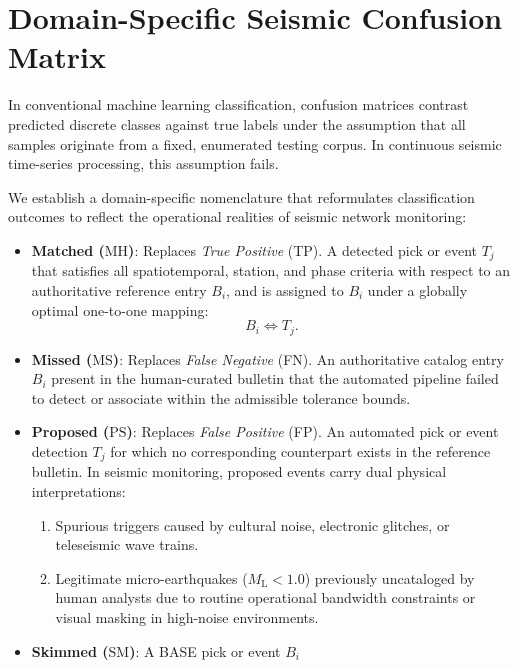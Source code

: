 \section{Domain-Specific Seismic Confusion Matrix}
\label{sec:confusion_matrix}

In conventional machine learning classification, confusion matrices
contrast predicted discrete classes against true labels under the
assumption that all samples originate from a fixed, enumerated
testing corpus. In continuous seismic time-series processing, this
assumption fails.

We establish a domain-specific nomenclature that reformulates
classification outcomes to reflect the operational realities of
seismic network monitoring:

\begin{itemize}
  \item \textbf{Matched ($\mathrm{MH}$)}: Replaces \textit{True
    Positive} (\ac{TP}). A detected pick or event $T_j$ that
    satisfies all spatiotemporal, station, and phase criteria with
    respect to an authoritative reference entry $B_i$, and is
    assigned to $B_i$ under a globally optimal one-to-one mapping:
    \begin{equation}
      B_i \Longleftrightarrow T_j.
    \end{equation}
  \item \textbf{Missed ($\mathrm{MS}$)}: Replaces \textit{False
    Negative} (\ac{FN}). An authoritative catalog entry $B_i$
    present in the human-curated bulletin that the automated
    pipeline failed to detect or associate within the admissible
    tolerance bounds.
  \item \textbf{Proposed ($\mathrm{PS}$)}: Replaces \textit{False
    Positive} (\ac{FP}). An automated pick or event detection
    $T_j$ for which no corresponding counterpart exists in the
    reference bulletin. In seismic monitoring, proposed events carry
    dual physical interpretations:
    \begin{enumerate}
      \item Spurious triggers caused by cultural noise, electronic
        glitches, or teleseismic wave trains.
      \item Legitimate micro-earthquakes ($M_{\mathrm{L}} <
        \num{1.0}$) previously
        uncataloged by human analysts due to routine operational
        bandwidth constraints or visual masking in high-noise environments.
    \end{enumerate}
  \item \textbf{Skimmed ($\mathrm{SM}$)}: A BASE pick or event $B_i$

\end{itemize}
